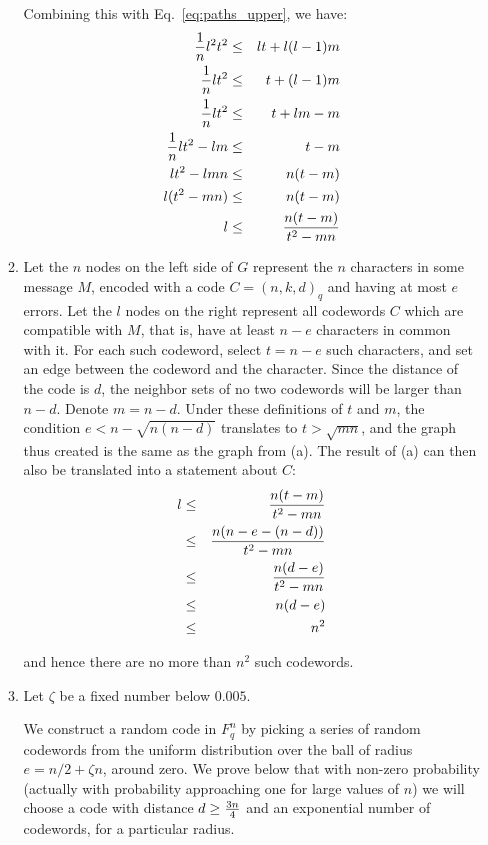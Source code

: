 \documentclass[11pt]{article} \usepackage{amssymb}
\begin{document}
\begin{enumerate}
\begin{enumerate}
    Combining this with Eq.~\ref{eq:paths_upper}, we have:
    \begin{eqnarray*}
      {1\over n}l^2t^2 &\leq& lt+l(l-1)m
      \\ {1\over n}lt^2 &\leq& t+(l-1)m
      \\ {1\over n}lt^2 &\leq& t+lm-m
      \\ {1\over n}lt^2 -lm &\leq& t-m
      \\ lt^2 - lmn &\leq& n(t-m)
      \\ l(t^2 - mn) &\leq& n(t-m)
      \\ l &\leq& {n(t-m)\over t^2 - mn}
    \end{eqnarray*}
    \item
    Let the $n$ nodes on the left side of $G$ represent the $n$ characters 
    in some message $M$, encoded with a code $C=(n,k,d)_q$ and having at most
    $e$ errors.  Let the $l$ nodes on the right
    represent all codewords $C$ which are compatible with $M$, that is, have
    at least $n-e$ characters in common with it. For each such codeword,
    select $t=n-e$ such characters, and set an edge between the codeword and the
    character. Since the distance of the code is $d$, the neighbor sets of no
    two codewords will be larger than $n-d$. Denote $m=n-d$. Under these
    definitions of $t$ and $m$, the condition $e<n-\sqrt{n(n-d)}$ translates
    to $t>\sqrt{mn}$, and the graph thus created is the same as the graph
    from (a). The result of (a) can then also be translated into a statement
    about $C$:
    \begin{eqnarray*}
      l &\leq& {n(t-m)\over t^2 - mn}
      \\ &\leq& {n(n-e-(n-d))\over t^2 - mn}
      \\ &\leq& {n(d-e)\over t^2 - mn}
      \\ &\leq& n(d-e)
      \\ &\leq& n^2
    \end{eqnarray*}

    and hence there are no more than $n^2$ such codewords.

    \item
      Let $\zeta$ be a fixed number below $0.005$.

      We construct a random code in $F_q^n$ by picking a series of random 
      codewords from the uniform distribution over the ball of 
      radius $e=n/2+\zeta n$, around zero. We prove below that with non-zero 
      probability (actually with probability approaching one for large 
      values of $n$) we will choose a code with distance $d\geq{3n\over 4}$
      and an exponential number of codewords, for a particular radius.


\end{enumerate}
\end{enumerate}
\end{document}
